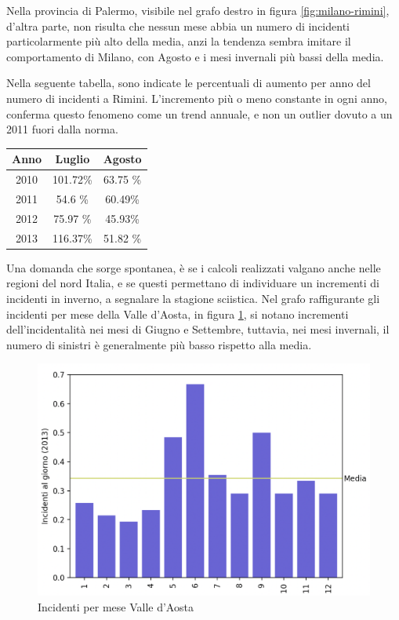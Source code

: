 \documentclass[a4paper,12pt]{report}
\begin{document}
Nella provincia di Palermo, visibile nel grafo destro in figura \ref{fig:milano-rimini}, 
d'altra parte, non risulta che nessun mese abbia un numero di incidenti 
particolarmente più alto della media, anzi la tendenza sembra imitare il comportamento di 
Milano, con Agosto e i mesi invernali più bassi della media.

Nella seguente tabella, sono indicate le percentuali di aumento per anno del numero di 
incidenti a Rimini.
L'incremento più o meno constante in ogni anno, conferma questo fenomeno come un trend 
annuale, e non un outlier dovuto a un 2011 fuori dalla norma.

\begin{center}
    \def\arraystretch{1.5}%
    \begin{tabular}{ |c|c|c| } 
    \hline
    Anno & Luglio   & Agosto \\ 
    \hline
    \rowcolor{TableGray}
    2010 & 101.72\% & 63.75 \% \\ 
    2011 & 54.6  \%  & 60.49\% \\
    \rowcolor{TableGray}
    2012 & 75.97 \%  & 45.93\%\\
    2013 & 116.37\% & 51.82 \%\\
    \hline
    \end{tabular}
\end{center}

Una domanda che sorge spontanea, è se i calcoli realizzati valgano anche nelle regioni 
del nord Italia, e se questi permettano di individuare un incrementi di incidenti in 
inverno, a segnalare la stagione sciistica.
Nel grafo raffigurante gli incidenti per mese della Valle d'Aosta, 
in figura \ref{fig:aosta}, si notano incrementi dell'incidentalità 
nei mesi di Giugno e Settembre, tuttavia, nei mesi invernali, il numero di sinistri è 
generalmente più basso rispetto alla media.

\begin{figure}
    \includegraphics[width=\linewidth]{../src/incidenti/incidenti_senza_coords/mese_incidenti/aosta_mese.png}
    \caption{Incidenti per mese Valle d'Aosta}
    \label{fig:aosta}
\end{figure}
\end{document}
